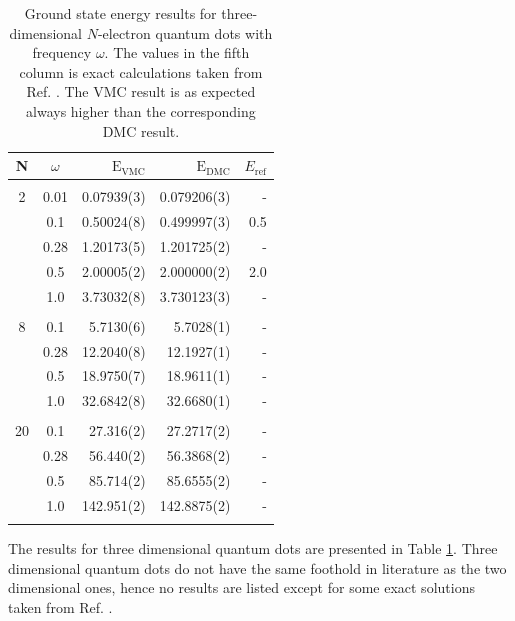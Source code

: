 \setlength{\tabcolsep}{1.05cm}
\begin{table}
\begin{center}
\begin{tabular}{cc|rrr}
    N     & $\omega$ & $\mathrm{E_{VMC}}$ & $\mathrm{E_{DMC}}$ & $E_\mathrm{ref}$\\
\hline\hline
\multicolumn{5}{c}{} \\
    2     &   0.01   & 0.07939(3)  & 0.079206(3) & -		\\
          &   0.1    & 0.50024(8)  & 0.499997(3) & 0.5        \\
          &   0.28   & 1.20173(5)  & 1.201725(2) & -		\\
          &   0.5    & 2.00005(2)  & 2.000000(2) & 2.0 \\
          &   1.0    & 3.73032(8)  & 3.730123(3) & - \\
\cline{2-5}
\multicolumn{5}{c}{} \\
    8     &   0.1    & 5.7130(6)   & 5.7028(1)   & - 		\\
          &   0.28   & 12.2040(8)  & 12.1927(1)  & -		\\
          &   0.5    & 18.9750(7)  & 18.9611(1)  & -\\
          &   1.0    & 32.6842(8)  & 32.6680(1)  & -\\
\cline{2-5}
\multicolumn{5}{c}{} \\
    20    &   0.1    & 27.316(2)   & 27.2717(2)   & - 		\\
          &   0.28   & 56.440(2)   & 56.3868(2)   & -		\\
          &   0.5    & 85.714(2)   & 85.6555(2)   & - \\
          &   1.0    & 142.951(2)  & 142.8875(2)  & -\\
\cline{2-5}
\multicolumn{5}{c}{} \\
\hline\hline
\end{tabular}
\caption{Ground state energy results for three-dimensional $N$-electron quantum dots with frequency $\omega$. The values in the fifth column is exact calculations taken from Ref. \cite{taut}. The VMC result is as expected always higher than the corresponding DMC result.}
\label{tab:QDotsResults3D}
\end{center}
\end{table}
\setlength{\tabcolsep}{6pt}

The results for three dimensional quantum dots are presented in Table \ref{tab:QDotsResults3D}. Three dimensional quantum dots do not have the same foothold in literature as the two dimensional ones, hence no results are listed except for some exact solutions taken from Ref. \cite{taut}. 

